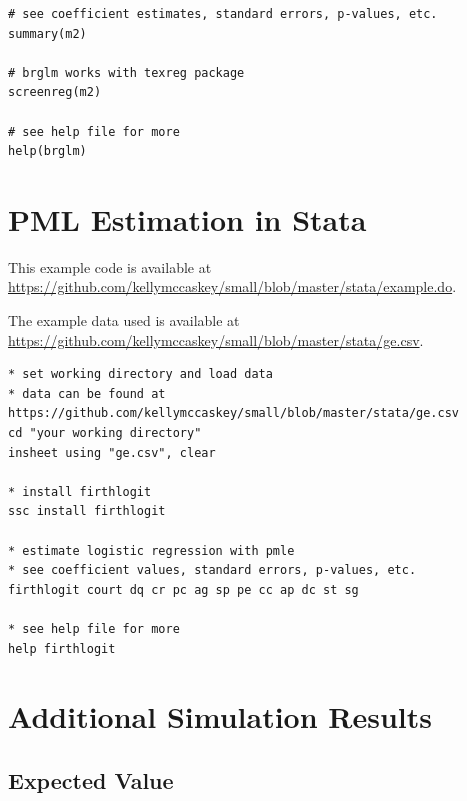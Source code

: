 \documentclass[12pt]{article}
\begin{document}
\begin{appendix}
\begin{footnotesize}
\begin{verbatim}
# see coefficient estimates, standard errors, p-values, etc.
summary(m2)

# brglm works with texreg package
screenreg(m2)

# see help file for more
help(brglm)
\end{verbatim}
\end{footnotesize}

\section{PML Estimation in Stata}\label{sec:pmle-in-stata}

This example code is available at \href{https://github.com/kellymccaskey/small/blob/master/stata/example.do}{https://github.com/kellymccaskey/small/blob/master/stata/example.do}.

\noindent The example data used is available at \href{https://github.com/kellymccaskey/small/blob/master/stata/GE.dta}{https://github.com/kellymccaskey/small/blob/master/stata/ge.csv}.

\begin{footnotesize}
\begin{verbatim}
* set working directory and load data
* data can be found at https://github.com/kellymccaskey/small/blob/master/stata/ge.csv
cd "your working directory"
insheet using "ge.csv", clear

* install firthlogit
ssc install firthlogit

* estimate logistic regression with pmle
* see coefficient values, standard errors, p-values, etc.
firthlogit court dq cr pc ag sp pe cc ap dc st sg

* see help file for more
help firthlogit

\end{verbatim}
\end{footnotesize}


\section{Additional Simulation Results}\label{sec:app-sims}

\subsection{Expected Value}


\end{appendix}
\end{document}
